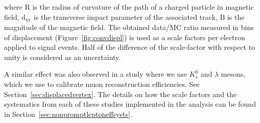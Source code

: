 \noindent where $\mathrm{R}$ is the radius of curvature of the path of
a charged particle in magnetic field, $\mathrm{d_{xy}}$ is the
transverse impact parameter of the associated track, $\mathrm{B}$ is the
magnitude of the magnetic field. The obtained data/MC ratio measured in bins of displacement
(Figure~\ref{fig:convdispl}) is used as a scale factors per
electron applied to signal events.  Half of the difference of the
scale-factor with respect to unity is considered as an uncertainty.

A similar effect was also observed in a study where we use $K_s^0$  and $\lambda$ mesons, which we use to calibrate \displ muon reconstruction efficiencies. See Section~\ref{sec:displacedvertex}.
The details on how the scale factors and the systematics from each of these studies implemented in the analysis can be found in Section~\ref{sec:nonpromptleptoneffsysts}.

